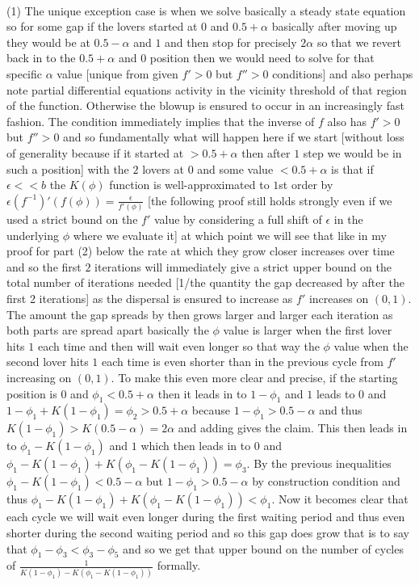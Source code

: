  \\
(1) The unique exception case is when we solve basically a steady state equation so for some gap if the lovers started at $0$ and $0.5+\alpha$ basically after moving up they would be at $0.5-\alpha$ and $1$ and then stop for precisely $2\alpha$ so that we revert back in to the $0.5+\alpha$ and $0$ position then we would need to solve for that specific $\alpha$ value [unique from given $f'>0$ but $f''>0$ conditions] and also perhaps note partial differential equations activity in the vicinity threshold of that region of the function. Otherwise the blowup is ensured to occur in an increasingly fast fashion. The condition immediately implies that the inverse of $f$ also has $f'>0$ but $f''>0$ and so fundamentally what will happen here if we start [without loss of generality because if it started at $>0.5+\alpha$ then after $1$ step we would be in such a position] with the $2$ lovers at $0$ and some value $< 0.5+\alpha$ is that if $\epsilon << b$ the $K(\phi)$ function is well-approximated to $1$st order by $\epsilon (f^{-1})'(f(\phi))=\frac{\epsilon}{f'(\phi)}$ [the following proof still holds strongly even if we used a strict bound on the $f'$ value by considering a full shift of $\epsilon$ in the underlying $\phi$ where we evaluate it] at which point we will see that like in my proof for part (2) below the rate at which they grow closer increases over time and so the first $2$ iterations will immediately give a strict upper bound on the total number of iterations needed [1/the quantity the gap decreased by after the first 2 iterations] as the dispersal is ensured to increase as $f'$ increases on $(0,1)$. The amount the gap spreads by then grows larger and larger each iteration as both parts are spread apart basically the $\phi$ value is larger when the first lover hits $1$ each time and then will wait even longer so that way the $\phi$ value when the second lover hits $1$ each time is even shorter than in the previous cycle from $f'$ increasing on $(0,1)$. To make this even more clear and precise, if the starting position is $0$ and $\phi_1<0.5+\alpha$ then it leads in to $1-\phi_1$ and $1$ leads to $0$ and $1-\phi_1+K(1-\phi_1)=\phi_2>0.5+\alpha$ because $1-\phi_1>0.5-\alpha$ and thus $K(1-\phi_1)>K(0.5-\alpha)=2\alpha$ and adding gives the claim. This then leads in to $\phi_1-K(1-\phi_1)$ and $1$ which then leads in to $0$ and $\phi_1-K(1-\phi_1)+K(\phi_1-K(1-\phi_1))=\phi_3$. By the previous inequalities $\phi_1-K(1-\phi_1)<0.5-\alpha$ but $1-\phi_1>0.5-\alpha$ by construction condition and thus $\phi_1-K(1-\phi_1)+K(\phi_1-K(1-\phi_1))<\phi_1$. Now it becomes clear that each cycle we will wait even longer during the first waiting period and thus even shorter during the second waiting period and so this gap does grow that is to say that $\phi_1-\phi_3<\phi_3-\phi_5$ and so we get that upper bound on the number of cycles of $\frac{1}{K(1-\phi_1)-K(\phi_1-K(1-\phi_1))}$ formally.

